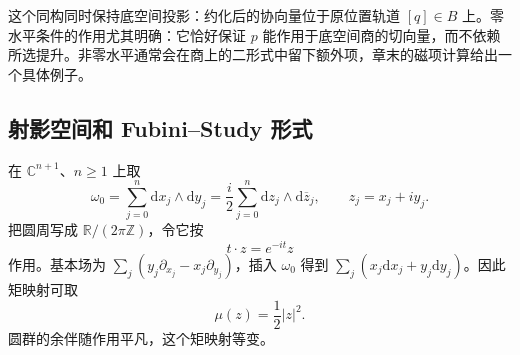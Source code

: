这个同构同时保持底空间投影：约化后的协向量位于原位置轨道 \([q]\in B\) 上。零水平条件的作用尤其明确：它恰好保证 \(p\) 能作用于底空间商的切向量，而不依赖所选提升。非零水平通常会在商上的二形式中留下额外项，章末的磁项计算给出一个具体例子。

\subsection{射影空间和 Fubini–Study 形式}
\label{g4:subsec:1003:02}

在 \(\mathbb C^{n+1}\)、\(n\ge1\) 上取
\[
	\omega_0=\sum_{j=0}^n\mathrm{d}x_j\wedge\mathrm{d}y_j
	=\frac{i}{2}\sum_{j=0}^n\mathrm{d}z_j\wedge\mathrm{d}\overline z_j,
	\qquad z_j=x_j+iy_j.
\]
把圆周写成 \(\mathbb R/(2\pi\mathbb Z)\)，令它按
\[
	t\cdot z=e^{-it}z
\]
作用。基本场为 \(\sum_j(y_j\partial_{x_j}-x_j\partial_{y_j})\)，插入 \(\omega_0\) 得到 \(\sum_j(x_j\mathrm{d}x_j+y_j\mathrm{d}y_j)\)。因此矩映射可取
\begin{equation}\label{g4:eq:1003:projective-moment}
	\mu(z)=\frac12|z|^2.
\end{equation}
圆群的余伴随作用平凡，这个矩映射等变。

